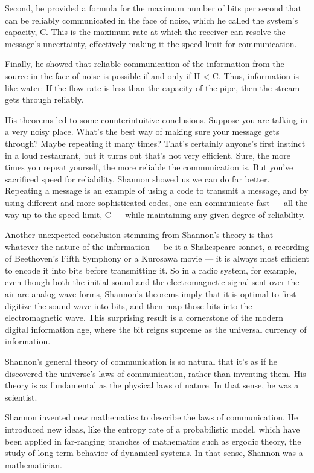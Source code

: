 \documentclass[
]{book}
\begin{document}
Second, he provided a formula for the maximum number of bits per second that can be reliably communicated in the face of noise, which he called the system's capacity, C. This is the maximum rate at which the receiver can resolve the message's uncertainty, effectively making it the speed limit for communication.

Finally, he showed that reliable communication of the information from the source in the face of noise is possible if and only if H \textless{} C. Thus, information is like water: If the flow rate is less than the capacity of the pipe, then the stream gets through reliably.

His theorems led to some counterintuitive conclusions. Suppose you are talking in a very noisy place. What's the best way of making sure your message gets through? Maybe repeating it many times? That's certainly anyone's first instinct in a loud restaurant, but it turns out that's not very efficient. Sure, the more times you repeat yourself, the more reliable the communication is. But you've sacrificed speed for reliability. Shannon showed us we can do far better. Repeating a message is an example of using a code to transmit a message, and by using different and more sophisticated codes, one can communicate fast --- all the way up to the speed limit, C --- while maintaining any given degree of reliability.

Another unexpected conclusion stemming from Shannon's theory is that whatever the nature of the information --- be it a Shakespeare sonnet, a recording of Beethoven's Fifth Symphony or a Kurosawa movie --- it is always most efficient to encode it into bits before transmitting it. So in a radio system, for example, even though both the initial sound and the electromagnetic signal sent over the air are analog wave forms, Shannon's theorems imply that it is optimal to first digitize the sound wave into bits, and then map those bits into the electromagnetic wave. This surprising result is a cornerstone of the modern digital information age, where the bit reigns supreme as the universal currency of information.

Shannon's general theory of communication is so natural that it's as if he discovered the universe's laws of communication, rather than inventing them. His theory is as fundamental as the physical laws of nature. In that sense, he was a scientist.

Shannon invented new mathematics to describe the laws of communication. He introduced new ideas, like the entropy rate of a probabilistic model, which have been applied in far-ranging branches of mathematics such as ergodic theory, the study of long-term behavior of dynamical systems. In that sense, Shannon was a mathematician.
\end{document}
